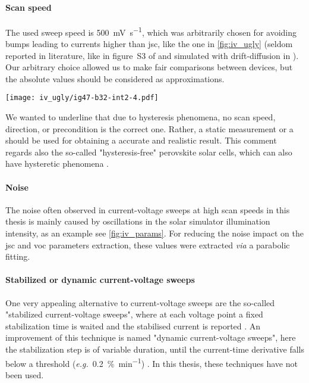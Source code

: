 	\paragraph{Scan speed} The used sweep speed is \SI{500}{\mV\per\s}, which was arbitrarily chosen for avoiding bumps leading to currents higher than \gls{jsc}, like the one in \cref{fig:iv_ugly} (seldom reported in literature, like in figure~S3 of \cite{Du2018} and simulated with drift-diffusion in \cite{Walter2018}).
	Our arbitrary choice allowed us to make fair comparisons between devices, but the absolute values should be considered as approximations.
	\begin{SCfigure}%
		\centering
		\texttt{[image: iv\_ugly/ig47-b32-int2-4.pdf]}
		\label{fig:iv_ugly}
	\end{SCfigure}
	We wanted to underline that due to hysteresis phenomena, no scan speed, direction, or precondition is the correct one.
	Rather, a static measurement or a  should be used for obtaining a accurate and realistic result.
	This comment regards also the so-called "hysteresis-free" perovskite solar cells, which can also have hysteretic phenomena \cite{Jacobs2018,Du2018}.

	\paragraph{Noise} The noise often observed in current-voltage sweeps at high scan speeds in this thesis is mainly caused by oscillations in the solar simulator illumination intensity, as an example see \cref{fig:iv_params}.
	For reducing the noise impact on the \gls{jsc} and \gls{voc} parameters extraction, these values were extracted \textsl{via} a parabolic fitting.

	\paragraph{Stabilized or dynamic current-voltage sweeps} One very appealing alternative to current-voltage sweeps are the so-called "stabilized current-voltage sweeps", where at each voltage point a fixed stabilization time is waited and the stabilised current is reported \cite{Unger2014, Christoforo2015}.
	An improvement of this technique is named "dynamic current-voltage sweeps", here the stabilization step is of variable duration, until the current-time derivative falls below a threshold (\textsl{e.g.}\ \SI{0.2}{\%\per\minute}) \cite{Dunbar2017,Dunbar2017a}.
	In this thesis, these techniques have not been used.

